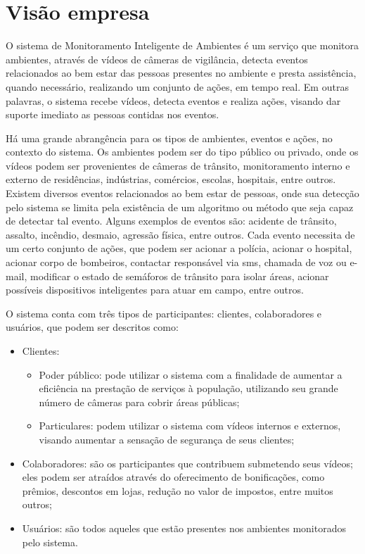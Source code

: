\documentclass[]{politex}
\begin{document}
\section{Visão empresa}
O sistema de Monitoramento Inteligente de Ambientes é um serviço que monitora ambientes, através de vídeos de câmeras de vigilância, detecta eventos relacionados ao bem estar das pessoas presentes no ambiente e presta assistência, quando necessário, realizando um conjunto de ações, em tempo real. Em outras palavras, o sistema recebe vídeos, detecta eventos e realiza ações, visando dar suporte imediato as pessoas contidas nos eventos.

Há uma grande abrangência para os tipos de ambientes, eventos e ações, no contexto do sistema. Os ambientes podem ser do tipo público ou privado, onde os vídeos podem ser provenientes de câmeras de trânsito, monitoramento interno e externo de residências, indústrias, comércios, escolas, hospitais, entre outros. Existem diversos eventos relacionados ao bem estar de pessoas, onde sua detecção pelo sistema se limita pela existência de um algoritmo ou método que seja capaz de detectar tal evento. Alguns exemplos de eventos são: acidente de trânsito, assalto, incêndio, desmaio, agressão física, entre outros. Cada evento necessita de um certo conjunto de ações, que podem ser acionar a polícia, acionar o hospital, acionar corpo de bombeiros, contactar responsável via \acrshort{sms}, chamada de voz ou e-mail, modificar o estado de semáforos de trânsito para isolar áreas, acionar possíveis dispositivos inteligentes para atuar em campo, entre outros.

O sistema conta com três tipos de participantes: clientes, colaboradores e usuários, que podem ser descritos como:

\begin{itemize}
    \item Clientes:
    \begin{itemize}
        \item Poder público: pode utilizar o sistema com a finalidade de aumentar a eficiência na prestação de serviços à população, utilizando seu grande número de câmeras para cobrir áreas públicas;
        \item Particulares: podem utilizar o sistema com vídeos internos e externos, visando aumentar a sensação de segurança de seus clientes;
    \end{itemize}
    \item Colaboradores: são os participantes que contribuem submetendo seus vídeos; eles podem ser atraídos através do oferecimento de bonificações, como prêmios, descontos em lojas, redução no valor de impostos, entre muitos outros;
    \item Usuários: são todos aqueles que estão presentes nos ambientes monitorados pelo sistema.
\end{itemize}
\end{document}
